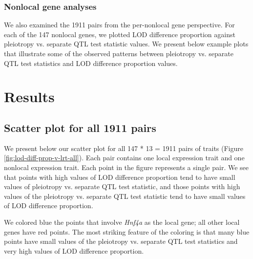 \documentclass{article}
\begin{document}
\subsubsection{Nonlocal gene analyses}

We also examined the 1911 pairs from the per-nonlocal gene perspective. For each of the 147 nonlocal genes, we plotted LOD difference proportion against pleiotropy vs. separate QTL test statistic values. We present below example plots that illustrate some of the observed patterns between pleiotropy vs. separate QTL test statistics and LOD difference proportion values.


\section{Results}

\subsection{Scatter plot for all 1911 pairs}

We present below our scatter plot for all 147 * 13 = 1911 pairs of traits (Figure \ref{fig:lod-diff-prop-v-lrt-all}). Each pair contains one local expression trait and one nonlocal expression trait. Each point in the figure represents a single pair. We see that points with high values of LOD difference proportion tend to have small values of pleiotropy vs. separate QTL test statistic, and those points with high values of the pleiotropy vs. separate QTL test statistic tend to have small values of LOD difference proportion. 

We colored blue the points that involve \emph{Hnf4a} as the local gene; all other local genes have red points. The most striking feature of the coloring is that many blue points have small values of the pleiotropy vs. separate QTL test statistics and very high values of LOD difference proportion. 
\end{document}
